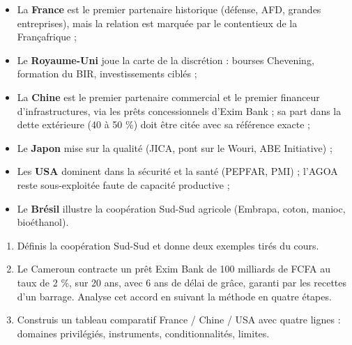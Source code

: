 \documentclass[11pt]{article}
\begin{document}
\begin{aretenir}
\begin{itemize}
\item La \textbf{France} est le premier partenaire historique (défense, AFD, grandes entreprises), mais la relation est marquée par le contentieux de la Françafrique ;
\item Le \textbf{Royaume-Uni} joue la carte de la discrétion : bourses Chevening, formation du BIR, investissements ciblés ;
\item La \textbf{Chine} est le premier partenaire commercial et le premier financeur d'infrastructures, via les prêts concessionnels d'Exim Bank ; sa part dans la dette extérieure (40 à 50 \%) doit être citée avec sa référence exacte ;
\item Le \textbf{Japon} mise sur la qualité (JICA, pont sur le Wouri, ABE Initiative) ;
\item Les \textbf{USA} dominent dans la sécurité et la santé (PEPFAR, PMI) ; l'AGOA reste sous-exploitée faute de capacité productive ;
\item Le \textbf{Brésil} illustre la coopération Sud-Sud agricole (Embrapa, coton, manioc, bioéthanol).
\end{itemize}
\end{aretenir}

\begin{exercice}
\begin{enumerate}
\item Définis la coopération Sud-Sud et donne deux exemples tirés du cours.
\item Le Cameroun contracte un prêt Exim Bank de 100 milliards de FCFA au taux de 2 \%, sur 20 ans, avec 6 ans de délai de grâce, garanti par les recettes d'un barrage. Analyse cet accord en suivant la méthode en quatre étapes.
\item Construis un tableau comparatif France / Chine / USA avec quatre lignes : domaines privilégiés, instruments, conditionnalités, limites.
\end{enumerate}
\end{exercice}
\end{document}
